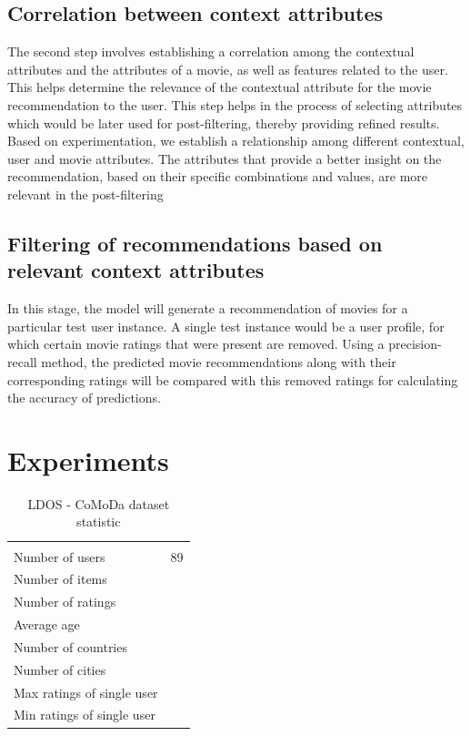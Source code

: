 \documentclass{article}
\begin{document}
\subsection{Correlation between context attributes}
The second step involves establishing a correlation among the contextual attributes and the attributes of a movie, as well as features related to the user. This helps determine the relevance of the contextual attribute for the movie recommendation to the user. This step helps in the process of selecting attributes which would be later used for post-filtering, thereby providing refined results. Based on experimentation, we establish a relationship among different contextual, user and movie attributes. The attributes that provide a better insight on the recommendation, based on their specific combinations and values, are more relevant in the post-filtering 

\subsection{Filtering of recommendations based on relevant context attributes}
In this stage, the model will generate a recommendation of movies for a particular test user instance. A single test instance would be a user profile, for which certain movie ratings that were present are removed. Using a precision-recall method, the predicted movie recommendations along with their corresponding ratings will be compared with this removed ratings for calculating the accuracy of predictions.



\section{Experiments}



\begin{table}
	\caption{LDOS - CoMoDa dataset statistic}
	\centering    
    \begin{tabular}{l|l}
    \hline
    \\
    Number of users            & 89 \\
    Number of items            & ~  \\
    Number of ratings          & ~  \\
    Average age                & ~  \\
    Number of countries        & ~  \\
    Number of cities           & ~  \\
    Max ratings of single user & ~  \\
    Min ratings of single user & ~  \\
    \end{tabular}
    \label{ldos}
\end{table}
\end{document}
